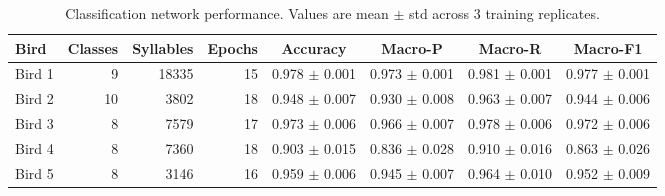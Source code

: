 \begin{table}[ht]
\centering
\caption{Classification network performance. Values are mean $\pm$ std across 3 training replicates.}
\begin{tabular}{l r r r c c c c}
\toprule
Bird & Classes & Syllables & Epochs & Accuracy & Macro-P & Macro-R & Macro-F1 \\
\midrule
Bird 1 & 9 & 18335 & 15 & 0.978 $\pm$ 0.001 & 0.973 $\pm$ 0.001 & 0.981 $\pm$ 0.001 & 0.977 $\pm$ 0.001 \\
Bird 2 & 10 & 3802 & 18 & 0.948 $\pm$ 0.007 & 0.930 $\pm$ 0.008 & 0.963 $\pm$ 0.007 & 0.944 $\pm$ 0.006 \\
Bird 3 & 8 & 7579 & 17 & 0.973 $\pm$ 0.006 & 0.966 $\pm$ 0.007 & 0.978 $\pm$ 0.006 & 0.972 $\pm$ 0.006 \\
Bird 4 & 8 & 7360 & 18 & 0.903 $\pm$ 0.015 & 0.836 $\pm$ 0.028 & 0.910 $\pm$ 0.016 & 0.863 $\pm$ 0.026 \\
Bird 5 & 8 & 3146 & 16 & 0.959 $\pm$ 0.006 & 0.945 $\pm$ 0.007 & 0.964 $\pm$ 0.010 & 0.952 $\pm$ 0.009 \\
\bottomrule
\end{tabular}
\end{table}
